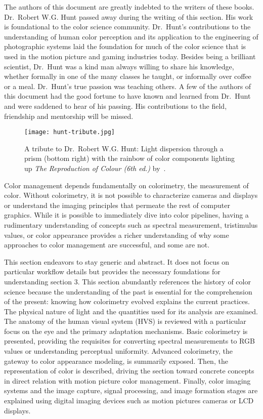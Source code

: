 The authors of this document are greatly indebted to the writers of these
books.
\ccpar{}
Dr.~Robert W.G. Hunt passed away during the writing of this section. His work
is foundational to the color science community. Dr.~Hunt’s contributions to the
understanding of human color perception and its application to the engineering
of photographic systems laid the foundation for much of the color science that
is used in the motion picture and gaming industries today. Besides being a
brilliant scientist, Dr.~Hunt was a kind man always willing to share his
knowledge, whether formally in one of the many classes he taught, or informally
over coffee or a meal. Dr.~Hunt’s true passion was teaching others. A few of
the authors of this document had the good fortune to have known and learned
from Dr.~Hunt and were saddened to hear of his passing. His contributions to
the field, friendship and mentorship will be missed.

\begin{figure}[H]
    \texttt{[image: hunt-tribute.jpg]}
    \caption{
        A tribute to Dr.~Robert W.G. Hunt: Light dispersion through a prism
        (bottom right) with the rainbow of color components lighting up
        \textit{The Reproduction of Colour (6th ed.)} by~\textcite{Hunt2004b}.
    }%
    \label{fig:hunt-tribute}
\end{figure}

Color management depends fundamentally on colorimetry, the measurement of
color. Without colorimetry, it is not possible to characterize cameras and
displays or understand the imaging principles that permeate the rest of
computer graphics. While it is possible to immediately dive into color
pipelines, having a rudimentary understanding of concepts such as spectral
measurement, tristimulus values, or color appearance provides a richer
understanding of why some approaches to color management are successful, and
some are not.

This section endeavors to stay generic and abstract. It does not focus on
particular workflow details but provides the necessary foundations for
understanding section 3. This section abundantly references the history of
color science because the understanding of the past is essential for the
comprehension of the present: knowing how colorimetry evolved explains the
current practices. The physical nature of light and the quantities used for
its analysis are examined. The anatomy of the human visual system (HVS) is
reviewed with a particular focus on the eye and the primary adaptation
mechanisms. Basic colorimetry is presented, providing the requisites for
converting spectral measurements to RGB values or understanding perceptual
uniformity. Advanced colorimetry, the gateway to color appearance modeling, is
summarily exposed. Then, the representation of color is described, driving the
section toward concrete concepts in direct relation with motion picture color
management. Finally, color imaging systems and the image capture, signal
processing, and image formation stages are explained using digital imaging
devices such as motion pictures cameras or LCD displays.

